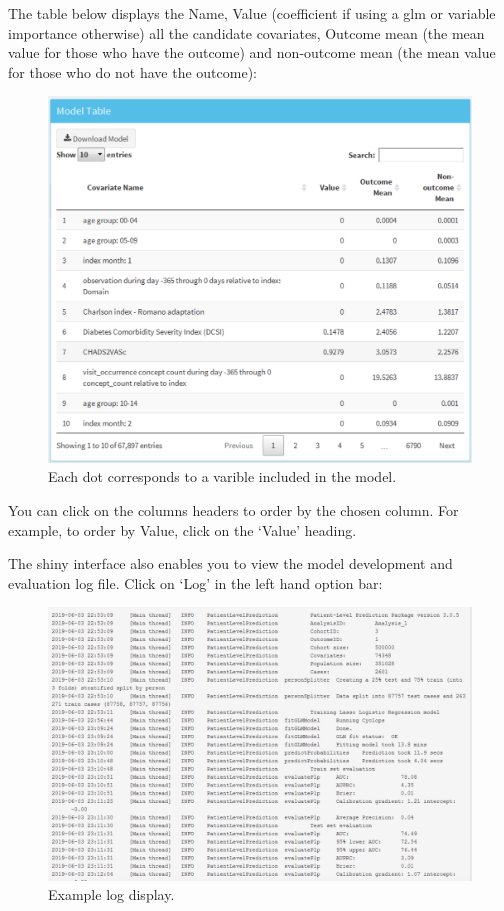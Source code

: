 \documentclass[11pt]{book}
\begin{document}
The table below displays the Name, Value (coefficient if using a glm or
variable importance otherwise) all the candidate covariates, Outcome
mean (the mean value for those who have the outcome) and non-outcome
mean (the mean value for those who do not have the outcome):

\begin{figure}

{\centering \includegraphics[width=0.8\linewidth]{images/PatientLevelPrediction/shiny/shinyModelTable} 

}

\caption{Each dot corresponds to a varible included in the model.}\label{fig:shinyModelTable}
\end{figure}

You can click on the columns headers to order by the chosen column. For
example, to order by Value, click on the `Value' heading.

The shiny interface also enables you to view the model development and
evaluation log file. Click on `Log' in the left hand option bar:

\begin{figure}

{\centering \includegraphics[width=0.8\linewidth]{images/PatientLevelPrediction/shiny/shinyLog} 

}

\caption{Example log display.}\label{fig:shinyLog}
\end{figure}
\end{document}
